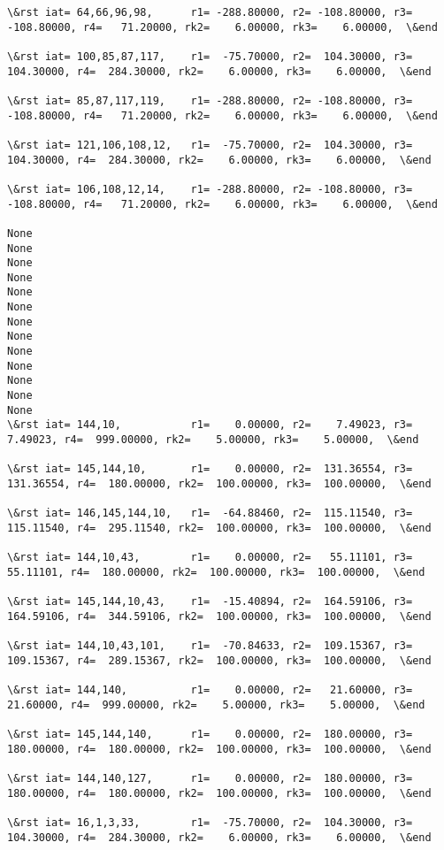 \documentclass[11pt]{article}
\begin{document}
\begin{Verbatim}[commandchars=\\\{\}]
\&rst iat= 64,66,96,98,      r1= -288.80000, r2= -108.80000, r3= -108.80000, r4=   71.20000, rk2=    6.00000, rk3=    6.00000,  \&end

\&rst iat= 100,85,87,117,    r1=  -75.70000, r2=  104.30000, r3=  104.30000, r4=  284.30000, rk2=    6.00000, rk3=    6.00000,  \&end

\&rst iat= 85,87,117,119,    r1= -288.80000, r2= -108.80000, r3= -108.80000, r4=   71.20000, rk2=    6.00000, rk3=    6.00000,  \&end

\&rst iat= 121,106,108,12,   r1=  -75.70000, r2=  104.30000, r3=  104.30000, r4=  284.30000, rk2=    6.00000, rk3=    6.00000,  \&end

\&rst iat= 106,108,12,14,    r1= -288.80000, r2= -108.80000, r3= -108.80000, r4=   71.20000, rk2=    6.00000, rk3=    6.00000,  \&end

None
None
None
None
None
None
None
None
None
None
None
None
None
\&rst iat= 144,10,           r1=    0.00000, r2=    7.49023, r3=    7.49023, r4=  999.00000, rk2=    5.00000, rk3=    5.00000,  \&end

\&rst iat= 145,144,10,       r1=    0.00000, r2=  131.36554, r3=  131.36554, r4=  180.00000, rk2=  100.00000, rk3=  100.00000,  \&end

\&rst iat= 146,145,144,10,   r1=  -64.88460, r2=  115.11540, r3=  115.11540, r4=  295.11540, rk2=  100.00000, rk3=  100.00000,  \&end

\&rst iat= 144,10,43,        r1=    0.00000, r2=   55.11101, r3=   55.11101, r4=  180.00000, rk2=  100.00000, rk3=  100.00000,  \&end

\&rst iat= 145,144,10,43,    r1=  -15.40894, r2=  164.59106, r3=  164.59106, r4=  344.59106, rk2=  100.00000, rk3=  100.00000,  \&end

\&rst iat= 144,10,43,101,    r1=  -70.84633, r2=  109.15367, r3=  109.15367, r4=  289.15367, rk2=  100.00000, rk3=  100.00000,  \&end

\&rst iat= 144,140,          r1=    0.00000, r2=   21.60000, r3=   21.60000, r4=  999.00000, rk2=    5.00000, rk3=    5.00000,  \&end

\&rst iat= 145,144,140,      r1=    0.00000, r2=  180.00000, r3=  180.00000, r4=  180.00000, rk2=  100.00000, rk3=  100.00000,  \&end

\&rst iat= 144,140,127,      r1=    0.00000, r2=  180.00000, r3=  180.00000, r4=  180.00000, rk2=  100.00000, rk3=  100.00000,  \&end

\&rst iat= 16,1,3,33,        r1=  -75.70000, r2=  104.30000, r3=  104.30000, r4=  284.30000, rk2=    6.00000, rk3=    6.00000,  \&end


\end{Verbatim}
\end{document}
